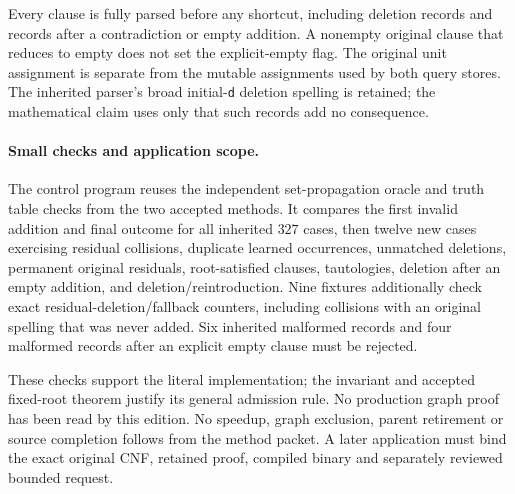 \documentclass[11pt]{article}
\begin{document}
Every clause is fully parsed before any shortcut, including deletion records
and records after a contradiction or empty addition. A nonempty original clause
that reduces to empty does not set the explicit-empty flag. The original unit
assignment is separate from the mutable assignments used by both query stores.
The inherited parser's broad initial-\texttt{d} deletion spelling is retained;
the mathematical claim uses only that such records add no consequence.

\paragraph{Small checks and application scope.}
The control program reuses the independent set-propagation oracle and truth
table checks from the two accepted methods. It compares the first invalid
addition and final outcome for all inherited $327$ cases, then twelve new
cases exercising residual collisions, duplicate learned occurrences,
unmatched deletions, permanent original residuals, root-satisfied clauses,
tautologies, deletion after an empty addition, and deletion/reintroduction.
Nine fixtures additionally check exact residual-deletion/fallback counters,
including collisions with an original spelling that was never added.
Six inherited malformed records and four malformed records after an explicit
empty clause must be rejected.

These checks support the literal implementation; the invariant and accepted
fixed-root theorem justify its general admission rule. No production graph
proof has been read by this edition. No speedup, graph exclusion, parent
retirement or source completion follows from the method packet. A later
application must bind the exact original CNF, retained proof, compiled binary
and separately reviewed bounded request.
\end{document}
